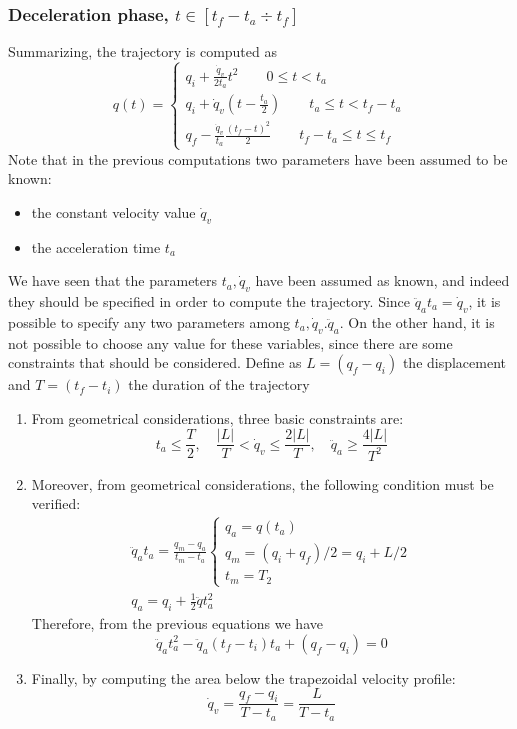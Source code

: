 \documentclass{book}
\begin{document}
\subsubsection{Deceleration phase, $t\in[t_f-t_a\div t_f]$}
Summarizing, the trajectory is computed as 
\[
  q(t)=\begin{cases}
    q_i+\displaystyle\frac{\dot{q}_v}{2t_a}t^2 \qquad 0\leq t<t_a\\
    q_i + \dot{q}_v\left(t-\displaystyle\frac{t_a}{2}\right) \qquad t_a\leq t<t_f-t_a\\
    q_f-\displaystyle\frac{\dot{q}_v}{t_a}\displaystyle\frac{(t_f-t)^2}{2} \qquad t_f-t_a\leq t \leq t_f
  \end{cases}
\]
Note that in the previous computations two parameters have been assumed to be known: 
\begin{itemize}
  \item the constant velocity value $\dot{q}_v$ 
  \item the acceleration time $t_a$
\end{itemize}
We have seen that the parameters $t_a,\dot{q}_v$ have been assumed as known, and indeed they should be specified in order to compute the trajectory. Since $\ddot{q}_at_a=\dot{q}_v$, it is possible to specify any two parameters among $t_a, \dot{q}_v. \ddot{q}_a$. On the other hand, it is not possible to choose any value for these variables, since there are some constraints that should be considered. Define as $L=(q_f-q_i)$ the displacement and $T=(t_f-t_i)$ the duration of the trajectory 
\begin{enumerate}
  \item From geometrical considerations, three basic constraints are: 
    \[
      t_a\leq \displaystyle\frac{T}{2}, \quad \displaystyle\frac{|L|}{T}<\dot{q}_v\leq\displaystyle\frac{2|L|}{T}, \quad \ddot{q}_a \geq \displaystyle\frac{4|L|}{T^2}
    \]
  \item Moreover, from geometrical considerations, the following condition must be verified: 
    \begin{gather*}
      \ddot{q}_at_a = \displaystyle\frac{q_m-q_a}{t_m-t_a}\begin{cases}
        q_a = q(t_a)\\
        q_m = (q_i+q_f)/2=q_i+L/2\\
        t_m = T_2
      \end{cases}\\
      q_a = q_i + \displaystyle\frac{1}{2}\ddot{q}t_a^2
    \end{gather*}
    Therefore, from the previous equations we have
    \begin{equation} \label{trap1}
      \ddot{q}_at_a^2-\ddot{q}_a(t_f-t_i)t_a + (q_f-q_i)=0
    \end{equation}
    \item Finally, by computing the area below the trapezoidal velocity profile: 
      \[
        \dot{q}_v = \displaystyle\frac{q_f-q_i}{T-t_a}=\displaystyle\frac{L}{T-t_a}
      \]
\end{enumerate}
\end{document}
